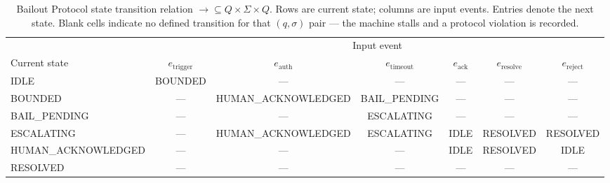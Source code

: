 \begin{table}[htbp]
\caption{Bailout Protocol state transition relation $\rightarrow \subseteq Q \times \Sigma \times Q$. Rows are current state; columns are input events. Entries denote the next state. Blank cells indicate no defined transition for that $(q, \sigma)$ pair — the machine stalls and a protocol violation is recorded.}
\label{tab:bailout-transition}
\begin{tabular}{@{}lcccccc@{}}
\toprule
 & \multicolumn{6}{c}{Input event} \\
\cmidrule(l){2-7}
Current state & $e_{\text{trigger}}$ & $e_{\text{auth}}$ & $e_{\text{timeout}}$ & $e_{\text{ack}}$ & $e_{\text{resolve}}$ & $e_{\text{reject}}$ \\
\midrule
IDLE              & BOUNDED            & — & — & — & — & — \\
BOUNDED           & — & HUMAN\_ACKNOWLEDGED & BAIL\_PENDING & — & — & — \\
BAIL\_PENDING     & — & — & ESCALATING & — & — & — \\
ESCALATING        & — & HUMAN\_ACKNOWLEDGED & ESCALATING & IDLE & RESOLVED & RESOLVED \\
HUMAN\_ACKNOWLEDGED & — & — & — & IDLE & RESOLVED & IDLE \\
RESOLVED          & — & — & — & — & — & — \\
\bottomrule
\end{tabular}
\end{table}


